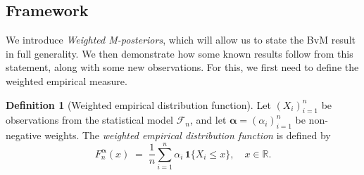 \documentclass[11pt, oneside]{amsart}
\theoremstyle{definition}   %
\newtheorem{definition}{Definition}
\newcommand{\wempirical}{F_n^{\boldsymbol{\alpha}}}
\begin{document}
\subsection{Framework}

We introduce \emph{Weighted M-posteriors}, which will allow us to state the BvM result in full generality. We then demonstrate how some known results \citep{kleijn:vandervaart2012, avellamedinaetal2021, chernozhukov:hong2003} follow from this statement, along with some new observations. For this, we first need to define the weighted empirical measure.

\begin{definition}[Weighted empirical distribution function]
    Let \( (X_i)_{i=1}^n \) be observations from the statistical model \( \mathcal{F}_n \), and let \( \boldsymbol{\alpha} = (\alpha_i)_{i=1}^n \) be non-negative weights.  The \emph{weighted empirical distribution function} is defined by
    \begin{equation}
        \label{def::weighted-empirical}
        \wempirical(x) \;=\; 
        \frac{1}{n}
        \sum_{i=1}^n \alpha_i \, \mathbf{1}\{X_i \leq x\},
        \quad x \in \mathbb{R}.
    \end{equation}
\end{definition}
\end{document}
